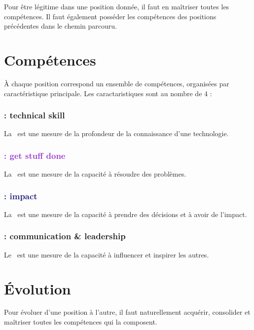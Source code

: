 \documentclass[a4paper, french, openany, 12pt]{book}
\newcommand\dexterity{\textcolor{BrickRed}{\bsc{Dexterity}}}
\newcommand\strength{\textcolor{DarkOrchid}{\bsc{Strength}}}
\newcommand\wisdom{\textcolor{MidnightBlue}{\bsc{Wisdom}}}
\newcommand\charisma{\textcolor{OliveGreen}{\bsc{Charisma}}}
\begin{document}
\begin{multicols}{2}
  Pour être légitime dans une position donnée, il faut en maîtriser toutes les compétences.
  Il faut également posséder les compétences des positions précédentes dans le chemin parcouru.
  
  \section*{Compétences}
  
  À chaque position correspond un ensemble de compétences, organisées par caractéristique principale.
  Les caractaristiques sont au nombre de 4 :
  
  \subsubsection*{\textcolor{BrickRed}{\textbf{ : technical skill}}} 
  
  La \dexterity\ est une mesure de la profondeur de la connaissance d'une technologie.
  
  \subsubsection*{\textcolor{DarkOrchid}{\textbf{ : get stuff done}}} 
  
  La \strength\ est une mesure de la capacité à résoudre des problèmes.
  
  \subsubsection*{\textcolor{MidnightBlue}{\textbf{ : impact}}} 
  
  La \wisdom\ est une mesure de la capacité à prendre des décisions et à avoir de l'impact.
  
  \subsubsection*{\textcolor{OliveGreen}{\textbf{ : communication \& leadership}}} 
  
  Le \charisma\ est une mesure de la capacité à influencer et inspirer les autres.
  
  \section*{Évolution}
  
  Pour évoluer d'une position à l'autre, il faut naturellement acquérir, consolider et maîtriser toutes les compétences
  qui la composent.
  

\end{multicols}
\end{document}
